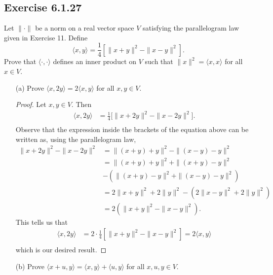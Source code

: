\subsection*{Exercise 6.1.27} Let \( \| \cdot \| \) be a norm on a real vector space \( V  \) satisfying the parallelogram law given in Exercise 11. Define
\[  \langle x , y \rangle = \frac{ 1 }{ 4 } [ \|x + y\|^{2} - \|x-y\|^{2}]. \]
Prove that \( \langle \cdot  ,  \cdot  \rangle  \) defines an inner product on \( V  \) such that \( \|x\|^{2} = \langle x , x \rangle \) for all \( x \in V  \).

\begin{enumerate}
    \item[(a)] Prove \( \langle x , 2y \rangle  = 2 \langle x , y \rangle \) for all \( x,y \in V  \). 
        \begin{proof}
        Let \( x,y \in V  \). Then
        \begin{align*}
            \langle x , 2y \rangle &= \frac{ 1 }{ 4 } \Big[ \|x + 2y\|^{2} - \|x - 2y\|^{2} \Big].  \\
        \end{align*}
        Observe that the expression inside the brackets of the equation above can be written as, using the parallelogram law, 
        \begin{align*}
            \|x + 2y\|^{2} - \|x - 2y\|^{2} &= \| (x+y) + y\|^{2} - \| (x-y) - y\|^{2} \\
                                            &=  \| (x+y) + y\|^{2} + \| (x+y) - y\|^{2}  \\ 
                                            &- (\|(x+y) - y\|^{2} + \| (x-y) - y\|^{2}) \\
                                            &=  2 \|x + y\|^{2} + 2 \|y\|^{2} - (2 \|x -y\|^{2} + 2 \|y\|^{2}) \\
                                            &= 2 (\|x + y\|^{2} - \|x -y\|^{2}).
        \end{align*}
        This tells us that 
        \begin{align*}
            \langle x , 2y \rangle &= 2 \cdot \frac{ 1 }{ 4 } [\|x + y\|^{2} - \|x -y\|^{2}] = 2 \langle x  , y \rangle   \\
        \end{align*}
        which is our desired result.
        \end{proof}
    \item[(b)] Prove \( \langle x + u  ,  y  \rangle = \langle x  , y \rangle + \langle u , y \rangle  \) for all \( x ,u,y \in V  \).

\end{enumerate}
